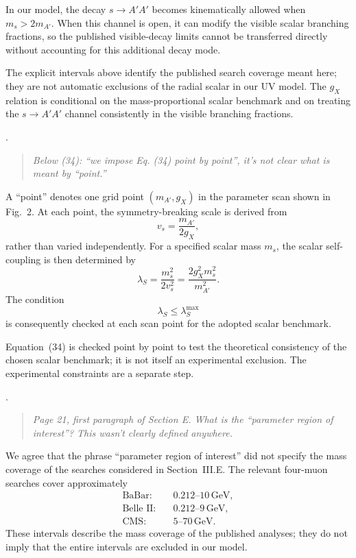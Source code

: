 \documentclass[12pt,a4paper]{article}
\begin{document}
In our model, the decay \(s\to A'A'\) becomes kinematically allowed when \(m_s>2m_{A'}\). When this channel is open, it can modify the visible scalar branching fractions, so the published visible-decay limits cannot be transferred directly without accounting for this additional decay mode.

The explicit intervals above identify the published search coverage meant here; they are not automatic exclusions of the radial scalar in our UV model. The \(g_X\) relation is conditional on the mass-proportional scalar benchmark and on treating the \(s\to A'A'\) channel consistently in the visible branching fractions.

\medskip
{}. \begin{quote}\itshape
Below (34): ``we impose Eq. (34) point by point'', it's not clear what is meant by ``point.''
\end{quote}

A ``point'' denotes one grid point \((m_{A'},g_X)\) in the parameter scan shown in Fig.~2. At each point, the symmetry-breaking scale is derived from
\[
v_s=\frac{m_{A'}}{2g_X},
\]
rather than varied independently. For a specified scalar mass \(m_s\), the scalar self-coupling is then determined by
\[
\lambda_S
=\frac{m_s^2}{2v_s^2}
=\frac{2g_X^2m_s^2}{m_{A'}^2}.
\]
The condition
\[
\lambda_S\leq\lambda_S^{\max}
\]
is consequently checked at each scan point for the adopted scalar benchmark.

Equation~(34) is checked point by point to test the theoretical consistency of the chosen scalar benchmark; it is not itself an experimental exclusion. The experimental constraints are a separate step.

\medskip
{}. \begin{quote}\itshape
Page 21, first paragraph of Section E. What is the ``parameter region of interest''? This wasn't clearly defined anywhere.
\end{quote}

We agree that the phrase ``parameter region of interest'' did not specify the mass coverage of the searches considered in Section~III.E. The relevant four-muon searches cover approximately
\[
\begin{aligned}
\text{BaBar}:&\quad 0.212\text{--}10\,\mathrm{GeV},\\
\text{Belle II}:&\quad 0.212\text{--}9\,\mathrm{GeV},\\
\text{CMS}:&\quad 5\text{--}70\,\mathrm{GeV}.
\end{aligned}
\]
These intervals describe the mass coverage of the published analyses; they do not imply that the entire intervals are excluded in our model.
\end{document}
